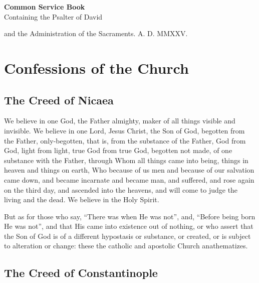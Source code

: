 \documentclass[14pt,openany]{book}
\begin{document}
	\raggedbottom
	\thispagestyle{empty}
	\begin{titlepage}
		\null
		\vspace*{\fill}
		\begin{center}
			{\Huge\bfseries Common Service Book}\\[1cm]
			{\Large Containing the Psalter of David}\par
			{\Large and the Administration of the Sacraments.}
			\vfill
			{A. D. \textcolor{rubric}{MMXXV}}.
		\end{center}
		\vspace*{\fill}
	\end{titlepage}

	\clearpage
	
	\tableofcontents
	
	\clearpage
	
	\chapter{Confessions of the Church}
	
		\section{The Creed of Nicaea}
		
			We believe in one God, the Father almighty, maker of all things visible and invisible. We believe in one Lord, Jesus Christ, the Son of God, begotten from the Father, only-begotten, that is, from the substance of the Father, God from God, light from light, true God from true God, begotten not made, of one substance with the Father, through Whom all things came into being, things in heaven and things on earth, Who because of us men and because of our salvation came down, and became incarnate and became man, and suffered, and rose again on the third day, and ascended into the heavens, and will come to judge the living and the dead. We believe in the Holy Spirit.
			
			But as for those who say, \enquote{There was when He was not}, and, \enquote{Before being born He was not}, and that His came into existence out of nothing, or who assert that the Son of God is of a different hypostasis or substance, or created, or is subject to alteration or change: these the catholic and apostolic Church anathematizes.
			
		\section{The Creed of Constantinople}
		
\end{document}
